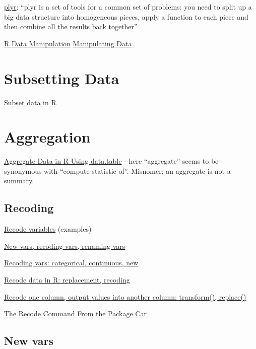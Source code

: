 \documentclass[reqno,12pt]{tufte-book}
\numberwithin{equation}{subsection}
\begin{document}
\href{http://plyr.had.co.nz/}{plyr}: ``plyr is a set of tools for a
common set of problems: you need to split up a big data structure into
homogeneous pieces, apply a function to each piece and then combine
all the results back together''


\href{http://rprogramming.net/r-data-manipulation/}{R Data Manipulation}
\href{http://www.cookbook-r.com/Manipulating\_data/}{Manipulating Data}

\section{Subsetting Data}
\label{sect:datasubsetting}

\href{http://rprogramming.net/subset-data-in-r/}{Subset data in R}

\section{Aggregation}
\label{sect:dataaggregate}

\href{http://rprogramming.net/aggregate-data-in-r-using-data-table/}{Aggregate
  Data in R Using data.table} - here ``aggregate'' seems to be
synonymous with ``compute statistic of''.  Misnomer; an aggregate is not a summary.

\subsection{Recoding}
\label{subs:recodingr}

\href{http://www.uni-kiel.de/psychologie/rexrepos/posts/recode.html}{Recode variables} (examples)

\href{http://www.statmethods.net/management/variables.html}{New vars, recoding vars, renaming vars}

\href{http://www.cookbook-r.com/Manipulating\_data/Recoding\_data/}{Recoding vars: categorical, continuous, new}

\href{http://rprogramming.net/recode-data-in-r/}{Recode data in R: replacement, recoding}

\href{http://rwiki.sciviews.org/doku.php?id=tips:data-frames:recode_column}{Recode one column, output values into another column: transform(), replace()}

\href{http://rprogramming.net/recode-data-in-r/}{The Recode Command From the Package Car}

\subsection{New vars}
\label{subsub:newvars}
\end{document}
